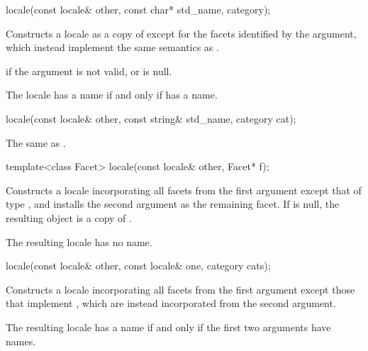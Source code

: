 %
\begin{itemdecl}
locale(const locale& other, const char* std_name, category);
\end{itemdecl}

\begin{itemdescr}
\pnum
\effects
Constructs a locale as a copy of
except for the facets identified by the
argument, which instead implement the same semantics as
.

\pnum
\throws
{}
if the argument is not valid, or is null.

\pnum
\remarks
The locale has a name if and only if
has a name.
\end{itemdescr}

%
\begin{itemdecl}
locale(const locale& other, const string& std_name, category cat);
\end{itemdecl}

\begin{itemdescr}
\pnum
\effects The same as .
\end{itemdescr}

%
\begin{itemdecl}
template<class Facet> locale(const locale& other, Facet* f);
\end{itemdecl}

\begin{itemdescr}
\pnum
\effects
Constructs a locale incorporating all facets from the first
argument except that of type
,
and installs the second argument as the remaining facet.
If 
is null, the resulting object is a copy of .

\pnum
\remarks
The resulting locale has no name.
\end{itemdescr}

%
\begin{itemdecl}
locale(const locale& other, const locale& one, category cats);
\end{itemdecl}

\begin{itemdescr}
\pnum
\effects
Constructs a locale incorporating all facets from the first argument
except those that implement
,
which are instead incorporated from the second argument.

\pnum
\remarks
The resulting locale has a name if and only if the first two arguments
have names.
\end{itemdescr}

